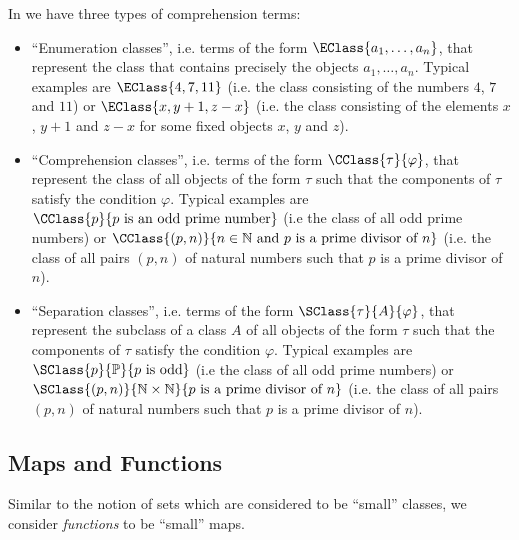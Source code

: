\documentclass{stex}
\begin{document}
In \ForTheL we have three types of comprehension terms:
\begin{itemize}
  \item ``Enumeration classes'', i.e. terms of the form
  $\EClass{a_1,\dots,a_n}$, that represent the class that contains precisely the
  objects $a_1,\dots,a_n$.
  Typical examples are $\EClass{4,7,11}$ (i.e. the class consisting of the
  numbers $4$, $7$ and $11$) or $\EClass{x,y+1,z-x}$ (i.e. the class consisting
  of the elements $x$, $y+1$ and $z-x$ for some fixed objects $x$, $y$ and $z$).
  \item ``Comprehension classes'', i.e. terms of the form
  $\CClass{\tau}{\varphi}$, that represent the class of all objects of the form
  $\tau$ such that the components of $\tau$ satisfy the condition $\varphi$.
  Typical examples are $\CClass{p}{p \text{ is an odd prime number}}$ (i.e the
  class of all odd prime numbers) or $\CClass{(p,n)}{n \in \mathbb{N}
  \text{ and } p \text{ is a prime divisor of } n}$ (i.e. the class of all pairs
  $(p,n)$ of natural numbers such that $p$ is a prime divisor of $n$).
  \item ``Separation classes'', i.e. terms of the form
  $\SClass{\tau}{A}{\varphi}$, that represent the subclass of a class $A$ of all
  objects of the form $\tau$ such that the components of $\tau$ satisfy the
  condition $\varphi$.
  Typical examples are $\SClass{p}{\mathbb{P}}{p \text{ is odd}}$ (i.e the
  class of all odd prime numbers) or $\SClass{(p,n)}{\mathbb{N}\times\mathbb{N}}
  {p \text{ is a prime divisor of } n}$ (i.e. the class of all pairs
  $(p,n)$ of natural numbers such that $p$ is a prime divisor of $n$).
\end{itemize}



\subsection{Maps and Functions}\label{sec:maps-and-functions}


Similar to the notion of sets which are considered to be ``small'' classes, we
consider \emph{functions} to be ``small'' maps.

\end{document}
